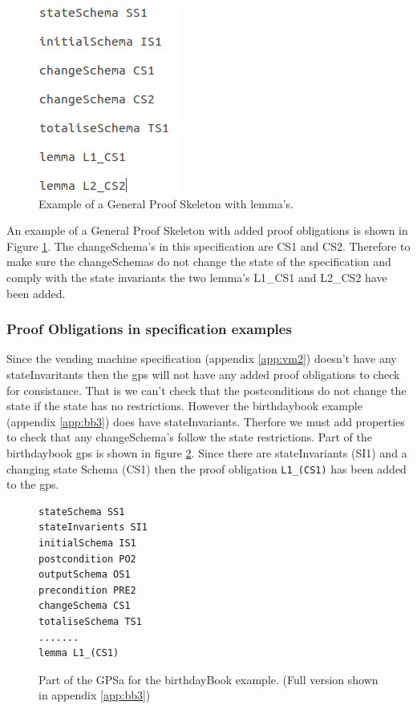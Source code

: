 \begin{figure}[H]
\centering
\includegraphics[scale=0.5]{Figures/skeleton/proofskeletonwithpo.png}
\caption{Example of a General Proof Skeleton with lemma's.}
\label{fig:gpswithpo}
\end{figure}

An example of a General Proof Skeleton with added proof obligations is shown in Figure \ref{fig:gpswithpo}. The changeSchema's in this specification are CS1 and CS2. Therefore to make sure the changeSchemas do not change the state of the specification and comply with the state invariants the two lemma's L1\_CS1 and L2\_CS2 have been added.

\subsubsection{Proof Obligations in specification examples}
Since the vending machine specification (appendix \ref{app:vm2}) doesn't have any stateInvaritants then the \gls{gps} will not have any added proof obligations to check for consistance. That is we can't check that the postconditions do not change the state if the state has no restrictions. However the birthdaybook example (appendix \ref{app:bb3}) does have stateInvariants. Therfore we must add properties to check that any changeSchema's follow the state restrictions. Part of the birthdaybook \gls{gps} is shown in figure \ref{fig:bbgps}. Since there are stateInvariants (SI1) and a changing state Schema (CS1) then the proof obligation \texttt{L1\_(CS1)} has been added to the \gls{gps}.

\begin{figure}[H]
\begin{verbatim}
stateSchema SS1 
stateInvarients SI1 
initialSchema IS1 
postcondition PO2 
outputSchema OS1 
precondition PRE2 
changeSchema CS1 
totaliseSchema TS1 
.......
lemma L1_(CS1) 
\end{verbatim}
\caption{Part of the GPSa for the birthdayBook example. (Full version shown in appendix \ref{app:bb3}) \label{fig:bbgps}}
\end{figure}

